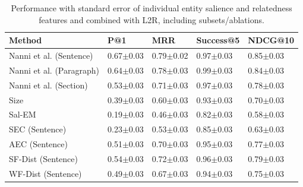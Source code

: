 \begin{table}[t]
    \caption{Performance with standard error of individual entity salience and relatedness features and combined with L2R, including subsets/ablations.}
    \label{tab:Results-shubham}
    \begin{tabular}{@{}lllll@{}}
        \toprule
        Method & P@1 & MRR & Success@5 & NDCG@10 \\
        
        \midrule
        
        Nanni et al. (Sentence) &
        0.67$\pm$0.03 & 
        0.79$\pm$0.02 &
        0.97$\pm$0.03 &
        0.85$\pm$0.03
        \\
        
         Nanni et al. (Paragraph) &
        0.64$\pm$0.03  & 
        0.78$\pm$0.03 &
         0.99$\pm$0.03 &
        0.84$\pm$0.03
        
        \\
        
         Nanni et al. (Section) &
       0.53$\pm$0.03 & 
       0.71$\pm$0.03 &
        0.97$\pm$0.03 &
        0.78$\pm$0.03
       \\
     
      Size &
      0.39$\pm$0.03&
      0.60$\pm$0.03 &
       0.93$\pm$0.03 &
        0.70$\pm$0.03
      \\
      
      \midrule
      
     
    Sal-EM   &   
      0.19$\pm$0.03 &
      0.46$\pm$0.03 &
       0.82$\pm$0.03 &
        0.58$\pm$0.03
      \\
      
      
      
      SEC (Sentence)  &    
      0.23$\pm$0.03 &
      0.53$\pm$0.03 &
       0.85$\pm$0.03 &
        0.63$\pm$0.03
      \\
      
      
      AEC (Sentence)   &    
      0.51$\pm$0.03 &
      0.70$\pm$0.03 &
       0.95$\pm$0.03 &
        0.77$\pm$0.03
      \\
       \midrule
      
     
      SF-Dist (Sentence)   &    
      0.54$\pm$0.03 &
      0.72$\pm$0.03 &
       0.96$\pm$0.03 &
        0.79$\pm$0.03
      \\
      
     
      WF-Dist (Sentence)  &    
      0.49$\pm$0.03 &
      0.67$\pm$0.03 &
       0.94$\pm$0.03 &
        0.75$\pm$0.03
      \\
      

\end{tabular}
\end{table}
